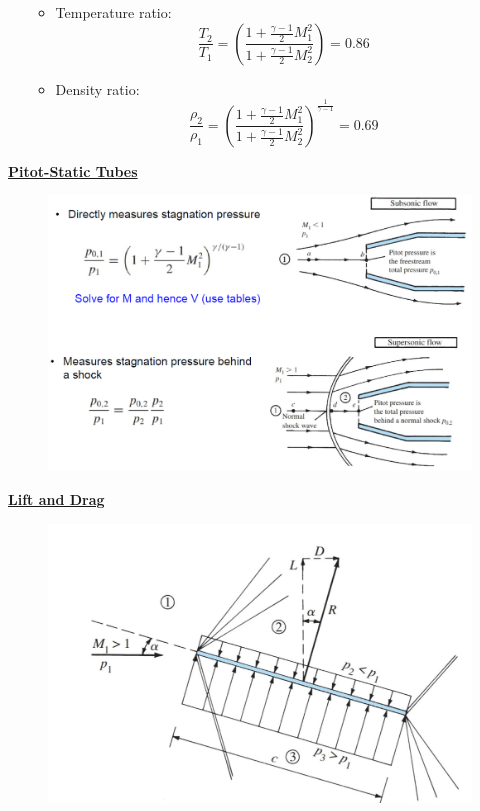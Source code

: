 \begin{itemize}
\begin{itemize}
\begin{equation*}
        \end{equation*}
        \item Temperature ratio:
        \begin{equation*}
            \frac{T_2}{T_1} = \left(\frac{1+\frac{\gamma-1}{2}M_1^2}{1+\frac{\gamma-1}{2}M_2^2}\right)= 0.86
        \end{equation*}
        \item Density ratio:
        \begin{equation*}
            \frac{\rho_2}{\rho_1} = \left(\frac{1+\frac{\gamma-1}{2}M_1^2}{1+\frac{\gamma-1}{2}M_2^2}\right)^{\frac{1}{\gamma-1}}= 0.69
        \end{equation*}
    \end{itemize}
\end{itemize}

\large \textbf{\underline{{\color{red}Pitot-Static Tubes}}}
\begin{figure}[H]
    \centering
    \includegraphics[width=1.0\linewidth]{images/Pitot_static_tubes.png}
\end{figure}

\large \textbf{\underline{{\color{red}Lift and Drag}}}
\begin{figure}[H]
    \centering
    \includegraphics[width=1.0\linewidth]{images/Compressible_Aerodynamics.png}
\end{figure}

